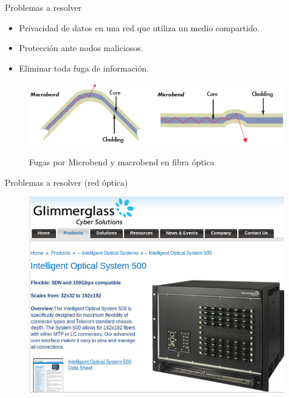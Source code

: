 \documentclass[aspectratio=169]{beamer}
\begin{document}
\begin{frame}{Problemas a resolver}

\begin{itemize}
 \item Privacidad de datos en una red que utiliza un medio compartido.
 \item Protección ante nodos maliciosos. 
 \item Eliminar toda fuga de información.
 \end{itemize}

 \begin{figure}[t]
  \centering
  \includegraphics[width=0.75 \textwidth]{graphs/microbend.png}
  
  Fugas por Microbend y macrobend en fibra óptica \cite{jay2010}
\end{figure}

\end{frame}



\begin{frame}{Problemas a resolver (red óptica)}
\begin{figure}[t]
  \centering
  \includegraphics[width=0.75 \textwidth]{graphs/glimmer1.jpg} 
\end{figure}
\end{frame}

\end{document}
